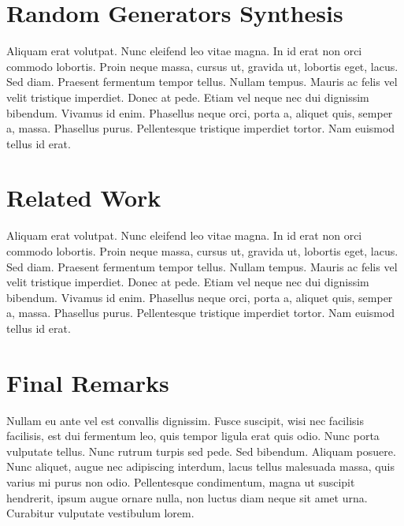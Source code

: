 \documentclass[conference, fleqn]{IEEEtran}
\begin{document}
\section{Random Generators Synthesis} \label{sec:synthesis}

Aliquam erat volutpat. Nunc eleifend leo vitae magna. In id erat non orci
commodo lobortis. Proin neque massa, cursus ut, gravida ut, lobortis eget,
lacus. Sed diam. Praesent fermentum tempor tellus. Nullam tempus. Mauris ac
felis vel velit tristique imperdiet. Donec at pede. Etiam vel neque nec dui
dignissim bibendum. Vivamus id enim. Phasellus neque orci, porta a, aliquet
quis, semper a, massa. Phasellus purus. Pellentesque tristique imperdiet tortor.
Nam euismod tellus id erat.
\section{Related Work}

Aliquam erat volutpat. Nunc eleifend leo vitae magna. In id erat non orci
commodo lobortis. Proin neque massa, cursus ut, gravida ut, lobortis eget,
lacus. Sed diam. Praesent fermentum tempor tellus. Nullam tempus. Mauris ac
felis vel velit tristique imperdiet. Donec at pede. Etiam vel neque nec dui
dignissim bibendum. Vivamus id enim. Phasellus neque orci, porta a, aliquet
quis, semper a, massa. Phasellus purus. Pellentesque tristique imperdiet tortor.
Nam euismod tellus id erat.
\section{Final Remarks}

Nullam eu ante vel est convallis dignissim. Fusce suscipit, wisi nec facilisis
facilisis, est dui fermentum leo, quis tempor ligula erat quis odio. Nunc porta
vulputate tellus. Nunc rutrum turpis sed pede. Sed bibendum. Aliquam posuere.
Nunc aliquet, augue nec adipiscing interdum, lacus tellus malesuada massa, quis
varius mi purus non odio. Pellentesque condimentum, magna ut suscipit hendrerit,
ipsum augue ornare nulla, non luctus diam neque sit amet urna. Curabitur
vulputate vestibulum lorem.



\end{document}
